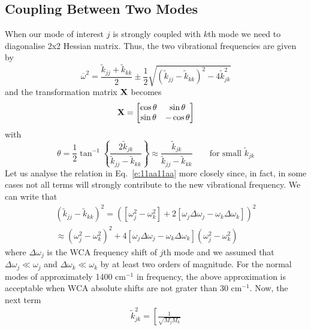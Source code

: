 \documentclass[b5paper,oneside,fleqn,11pt]{book}
\begin{document}
\begin{refsection}
\subsection{Coupling Between Two Modes\label{s:coupling-between-2-modes}}

When our mode of interest $j$ is strongly coupled
with $k$th mode we need to diagonalise 2x2 Hessian matrix.
Thus, the two vibrational frequencies are given by
%
\begin{equation} \label{e:11aa11aa}
 \overline{\omega}^2 = %
\frac{ \tilde{k}_{jj} + \tilde{k}_{kk} }{2}
\pm \frac{1}{2}
\sqrt{\left( \tilde{k}_{jj} - \tilde{k}_{kk}\right)^2 - 4\tilde{k}_{jk}^2}
\end{equation}
%
and the transformation matrix $\bf X$ becomes
%
\begin{equation} \label{e:ohoho}
 {\bf X} = 
\begin{bmatrix}
\cos{\theta} &   \sin{\theta}\\ 
\sin{\theta} &  -\cos{\theta}
\end{bmatrix}
\end{equation}
%
with
%
\begin{equation}
\theta = \frac{1}{2} \tan^{-1}\left\{\frac{2\tilde{k}_{jk}}{\tilde{k}_{jj} - \tilde{k}_{kk}}\right\} 
 \approx \frac{\tilde{k}_{jk}}{\tilde{k}_{jj} - \tilde{k}_{kk}} \qquad\text{for small $\tilde{k}_{jk}$}
\end{equation}
%
Let us analyse the relation in Eq.~\eqref{e:11aa11aa} more closely
since, in fact, in some cases not all terms will strongly contribute to the new vibrational
frequency. We can write that
%
\begin{multline}
 \left( \tilde{k}_{jj} - \tilde{k}_{kk}\right)^2 = 
 \left( \left[ \omega_j^2 - \omega_k^2 \right] 
 +
 2\left[ \omega_j\Delta\omega_j - \omega_k\Delta\omega_k \right]\right)^2 \\
 \approx \left( \omega_j^2 - \omega_k^2 \right)^2
 + 4 \left[ \omega_j\Delta\omega_j - \omega_k\Delta\omega_k \right] \left( \omega_j^2 - \omega_k^2 \right)
\end{multline}
%
where $\Delta\omega_j$ is the WCA frequency shift of $j$th mode
and we assumed that $\Delta\omega_j\ll\omega_j$ and $\Delta\omega_k\ll\omega_k$
by at least two orders of magnitude. For the
normal modes of approximately 1400 cm$^{-1}$
in frequency, the above approximation is acceptable
when WCA absolute shifts are not grater than 30 cm$^{-1}$.
Now, the next term
%
\begin{multline}
 \tilde{k}_{jk}^2 = \left[ \frac{1}{\sqrt{M_jM_k}}

\end{multline}
\end{refsection}
\end{document}

